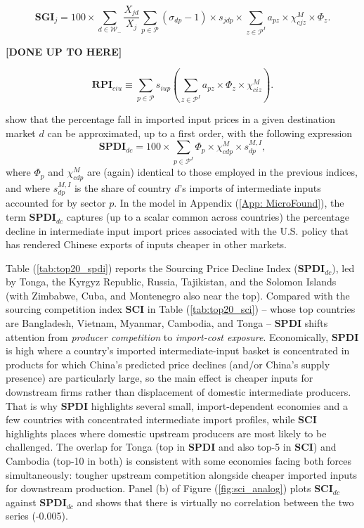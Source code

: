 \documentclass[english,12pt]{article}
\theoremstyle{definition}
\let\oldref\ref
\renewcommand{\ref}[1]{(\oldref{#1})}
\begin{document}
\begin{equation}
 \boldsymbol{SGI}_{j}=100\times\sum_{d\in\mathcal{W}_{-}}\frac{X_{jd}}{X_{j}}\sum_{p\in\mathcal{P}}\left(\sigma_{dp}-1\right)\times s_{jdp}\times\sum_{z\in \mathcal{P}^{I}}a_{pz}\times  \chi _{cjz}^{M}\times \Phi _{z}.
\label{eq: SGI}
\end{equation}

\textbf{[DONE UP TO HERE]}

\begin{equation}
\boldsymbol{RPI}_{ciu}\equiv \sum_{p\in \mathcal{P}}s_{iup}\left( \sum_{z\in 
\mathcal{P}^{I}}a_{pz}\times \Phi _{z}\times \chi _{ciz}^{M}\right) .
\label{eq: RPI Appendix}
\end{equation}


show that the percentage fall in imported input prices in a given
destination market $d$ can be approximated, up to a first order, with the
following expression%
\begin{equation}
\boldsymbol{SPDI}_{dc}=100 \times \sum_{p\in \mathcal{P}^{I}}\Phi _{p}\times \chi
_{cdp}^{M}\times s_{dp}^{M,I},
\label{eq: SPDI index}
\end{equation}%
where $\Phi _{p}$ and $\chi _{cdp}^{M}$ are (again) identical to those employed
in the previous indices, and where $%
s_{dp}^{M,I}$ is the share of country $d$'s imports of intermediate inputs
accounted for by sector $p$. In the model in Appendix \ref{App: MicroFound}, the term $%
\boldsymbol{SPDI}_{dc}$ captures (up to a scalar common across countries) the
percentage decline in intermediate input import prices associated with the
U.S. policy that has rendered Chinese exports of inputs cheaper in other markets.

Table \ref{tab:top20_spdi} reports the Sourcing Price Decline Index ($\boldsymbol{SPDI}_{dc}$), led by Tonga, the Kyrgyz Republic, Russia, Tajikistan, and the Solomon Islands (with Zimbabwe, Cuba, and Montenegro also near the top). Compared with the sourcing competition index $\boldsymbol{SCI}$ in Table \ref{tab:top20_sci} -- whose top countries are Bangladesh, Vietnam, Myanmar, Cambodia, and Tonga -- $\boldsymbol{SPDI}$ shifts attention from \emph{producer competition} to \emph{import-cost exposure}. Economically, $\boldsymbol{SPDI}$ is high where a country's imported intermediate-input basket is concentrated in products for which China's predicted price declines (and/or China's supply presence) are particularly large, so the main effect is cheaper inputs for downstream firms rather than displacement of domestic intermediate producers. That is why $\boldsymbol{SPDI}$ highlights several small, import-dependent economies and a few countries with concentrated intermediate import profiles, while $\boldsymbol{SCI}$ highlights places where domestic upstream producers are most likely to be challenged. The overlap for Tonga (top in $\boldsymbol{SPDI}$ and also top-5 in $\boldsymbol{SCI}$) and Cambodia (top-10 in both) is consistent with some economies facing both forces simultaneously: tougher upstream competition alongside cheaper imported inputs for downstream production. Panel (b) of Figure \ref{fig:sci_analog} plots $\boldsymbol{SCI}_{dc}$ against $\boldsymbol{SPDI}_{dc}$ and shows that there is virtually no correlation between the two series (-0.005).
\end{document}
